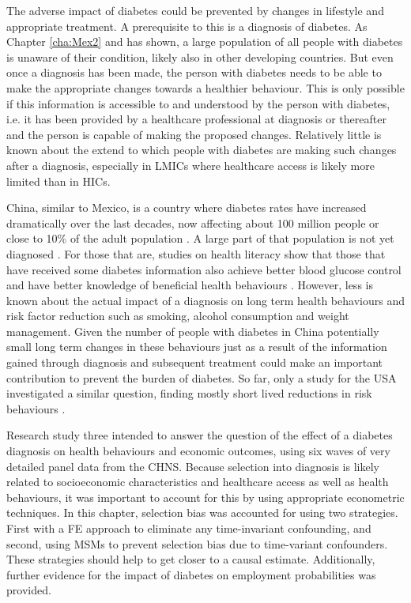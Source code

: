 The adverse impact of diabetes could be prevented by changes in lifestyle and appropriate treatment. A prerequisite to this is a diagnosis of diabetes. As Chapter \ref{cha:Mex2} and has shown, a large population of all people with diabetes is unaware of their condition, likely also in other developing countries. But even once a diagnosis has been made, the person with diabetes needs to be able to make the appropriate changes towards a healthier behaviour. This is only possible if this information is accessible to and understood by the person with diabetes, i.e. it has been provided by a healthcare professional at diagnosis or thereafter and the person is capable of making the proposed changes. Relatively little is known about the extend to which people with diabetes are making such changes after a diagnosis, especially in \acp{LMIC} where healthcare access is likely more limited than in \acp{HIC}.

China, similar to Mexico, is a country where diabetes rates have increased dramatically over the last decades, now affecting about 100 million people or close to 10\% of the adult population \parencite{Risk2016}. A large part of that population is not yet diagnosed \parencite{Wang2015}. For those that are, studies on health literacy show that those that have received some diabetes information also achieve better blood glucose control  and have better knowledge of beneficial health behaviours \parencite{Guo2012}. However, less is known about the actual impact of a diagnosis on long term health behaviours and risk factor reduction such as smoking, alcohol consumption and weight management. Given the number of people with diabetes in China potentially small long term changes in these behaviours just as a result of the information gained through diagnosis and subsequent treatment could make an important contribution to prevent the burden of diabetes. So far, only a study for the USA investigated a similar question, finding mostly short lived reductions in risk behaviours \parencite{Slade2012}. 

Research study three intended to answer the question of the effect of a diabetes diagnosis on health behaviours and economic outcomes, using six waves of very detailed panel data from the \ac{CHNS}. Because selection into diagnosis is likely related to socioeconomic characteristics and healthcare access as well as health behaviours, it was important to account for this by using appropriate econometric techniques. In this chapter, selection bias was accounted for using two strategies. First with a \ac{FE} approach to eliminate any time-invariant confounding, and second, using \acp{MSM} to prevent selection bias due to time-variant confounders. These strategies should help to get closer to a causal estimate. Additionally, further evidence for the impact of diabetes on employment probabilities was provided.

